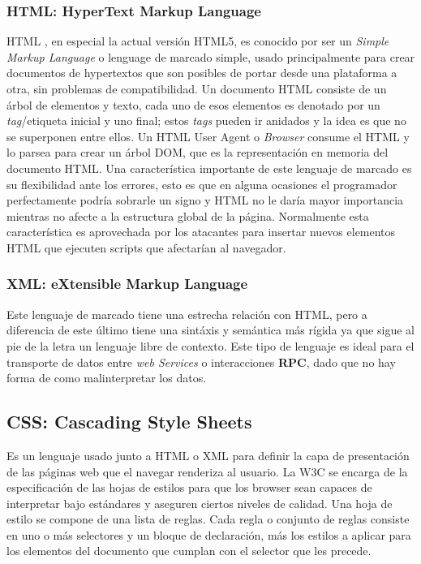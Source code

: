         \subsubsection{HTML: HyperText Markup Language}
        \label{chap2:HTML}
        HTML \cite{htmlSpec}, en especial la actual versión HTML5, es conocido por ser un \textit{Simple Markup Language} o lenguage de marcado simple, usado principalmente para crear documentos de hypertextos que son posibles de portar desde una plataforma a otra, sin problemas de compatibilidad. Un documento HTML consiste de un árbol de elementos y texto, cada uno de esos elementos es denotado por un \textit{tag}/etiqueta inicial y uno final; estos \textit{tags} pueden ir anidados y la idea es que no se superponen entre ellos. Un HTML User Agent o \textit{Browser} consume el HTML y lo parsea para crear un árbol DOM, que es la representación en memoria del documento HTML.
        Una característica importante de este lenguaje de marcado es su flexibilidad ante los errores, esto es que en alguna ocasiones el programador perfectamente podría sobrarle un signo y HTML no le daría mayor importancia mientras no afecte a la estructura global de la página. Normalmente esta característica es aprovechada por los atacantes para insertar nuevos elementos HTML que ejecuten scripts que afectarían al navegador.


        \subsubsection{XML: eXtensible Markup Language}
        \label{chap2:XML}
        Este lenguaje de marcado tiene una estrecha relación con HTML, pero a diferencia de este último tiene una sintáxis y semántica más rígida ya que sigue al pie de la letra un lenguaje libre de contexto. Este tipo de lenguaje es ideal para el transporte de datos entre \textit{web Services} o interacciones \textbf{RPC}, dado que no hay forma de como malinterpretar los datos.


    \subsection{CSS: Cascading Style Sheets}
    \label{chap2:css}
    Es un lenguaje usado junto a HTML o XML para definir la capa de presentación de las páginas web que el navegar renderiza al usuario. La W3C se encarga de la especificación de las hojas de estilos para que los browser sean capaces de interpretar bajo estándares y aseguren ciertos niveles de calidad. Una hoja de estilo se compone de una lista de reglas. Cada regla o conjunto de reglas consiste en uno o más selectores y un bloque de declaración, más los estilos a aplicar para los elementos del documento que cumplan con el selector que les precede. 


